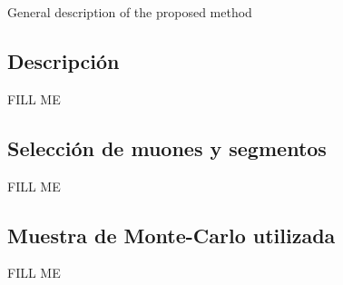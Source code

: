 General description of the proposed method

\subsection{Descripci\'on}\label{method_description}

FILL ME


\subsection{Selecci\'on de muones y segmentos}\label{selection}

FILL ME


\subsection{Muestra de Monte-Carlo utilizada}\label{sample}

FILL ME

